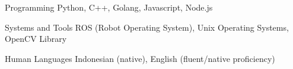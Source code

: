 

\begin{cvskills}

  \cvskill
    {Programming} %
    {Python, C++, Golang, Javascript, Node.js} %

  \cvskill
    {Systems and Tools} %
    {ROS (Robot Operating System), Unix Operating Systems, OpenCV Library} %

  \cvskill
    {Human Languages} %
    {Indonesian (native), English (fluent/native proficiency)} %

\end{cvskills}
